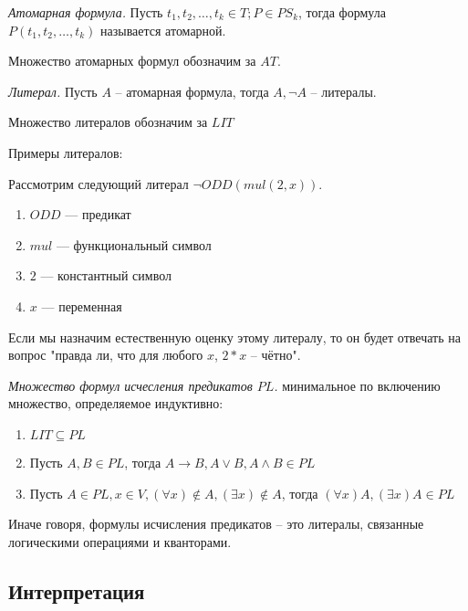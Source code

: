 \begin{definition}
  \emph{Атомарная формула.} Пусть $t_1, t_2, \ldots, t_k \in T; P \in PS_k$, тогда формула $P(t_1, t_2, \ldots, t_k)$ называется атомарной.
\end{definition}

Множество атомарных формул обозначим за $AT$. 

\begin{definition}
  \emph{Литерал.} Пусть $A$ -- атомарная формула, тогда $A, \neg A$ -- литералы.
\end{definition}

Множество литералов обозначим за $LIT$

Примеры литералов:
\begin{example}
Рассмотрим следующий литерал
$\neg ODD(mul(2,x))$.  
\begin{enumerate}
	\item $ODD$ --- предикат
    \item $mul$ --- функциональный символ
    \item $2$ --- константный символ
    \item $x$ --- переменная
\end{enumerate}
Если мы назначим естественную оценку этому литералу, то он будет отвечать на вопрос "правда ли, что для любого $x$, $2*x$ -- чётно". 
\end{example}


\begin{definition}
  \emph{Множество формул исчесления предикатов $PL$.} минимальное по включению множество, определяемое индуктивно:
  \begin{enumerate}
  	\item $LIT \subseteq PL$
    \item Пусть $A, B \in PL$, тогда $A \to B, A \vee B, A \wedge B \in PL$ 
    \item Пусть $A \in PL, x \in V, (\forall x) \notin A, (\exists x) \notin A$, тогда $(\forall x)A, (\exists x)A \in PL$
  \end{enumerate}
\end{definition}

Иначе говоря, формулы исчисления предикатов -- это литералы, связанные логическими операциями и кванторами.

\subsection{Интерпретация}


